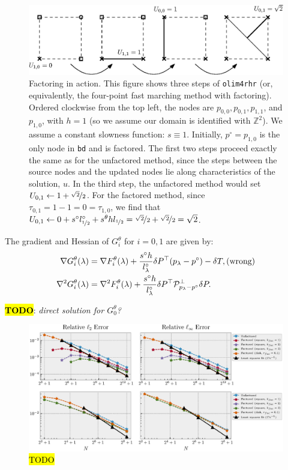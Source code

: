 \documentclass[eikonal.tex]{subfiles}
\begin{document}
\begin{figure}
  \centering
  \includegraphics{factoring-example.eps}
  \caption{Factoring in action. This figure shows three steps of
    \texttt{olim4rhr} (or, equivalently, the four-point fast marching
    method with factoring). Ordered clockwise from the top left, the
    nodes are $p_{0, 0}, p_{0, 1}, p_{1, 1}$, and $p_{1, 0}$, with
    $h = 1$ (so we assume our domain is identified with
    $\mathbb{Z}^2$). We assume a constant slowness function:
    $s \equiv 1$. Initially, $p^\circ = p_{1, 0}$ is the only node in
    \texttt{bd} and is factored. The first two steps proceed exactly
    the same as for the unfactored method, since the steps between the
    source nodes and the updated nodes lie along characteristics of
    the solution, $u$. In the third step, the unfactored method would
    set $U_{0,1} \gets 1 + \nicefrac{\sqrt{2}}{2}$. For the factored
    method, since $\tau_{0,1} = 1 - 1 = 0 = \tau_{1,0}$, we find that
    $U_{0,1} \gets 0 + s^\circ l^\circ_{\nicefrac{1}{2}} + s^\theta h
    l_{\nicefrac{1}{2}} = \nicefrac{\sqrt{2}}{2} +
    \nicefrac{\sqrt{2}}{2} = \sqrt{2}$.}
\end{figure}

\begin{lemma}
  The gradient and Hessian of $G_i^\theta$ for $i = 0, 1$ are given
  by:
  \begin{align}
    \label{eq:G-grad-hess}
    \nabla G_i^\theta(\lambda) &= \nabla F_i^\theta(\lambda) + \frac{s^\circ h}{l^\circ_\lambda} \delta P^\top {(p_\lambda - p^\circ)} - \delta T, \mbox{(wrong)} \\
    \nabla^2 G_i^\theta(\lambda) &= \nabla^2 F_i^\theta(\lambda) + \frac{s^\circ h}{l^\circ_\lambda} \delta P^\top \calP^\perp_{p_\lambda - p^\circ} \delta P.
  \end{align}
\end{lemma}

\hl{\textbf{TODO}}: \emph{direct solution for $G_0^\theta$?}

\begin{figure}[h]
  \centering
  \includegraphics[width=\linewidth]{factoring-error-example.eps}
  \caption{\hl{TODO}}
  \label{fig:factoring-error-example}
\end{figure}
\end{document}
